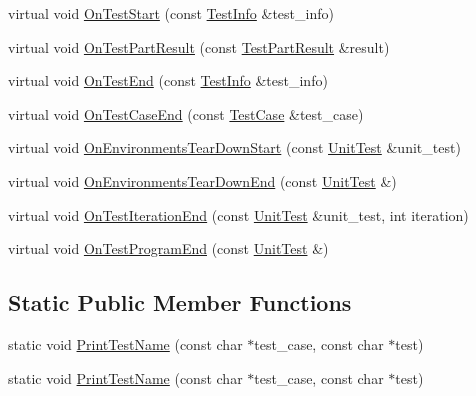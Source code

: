 \begin{DoxyCompactItemize}
\item 
virtual void \hyperlink{classtesting_1_1internal_1_1PrettyUnitTestResultPrinter_ae19a0ede8525bdc3ec6e05725004769b}{\-On\-Test\-Start} (const \hyperlink{classtesting_1_1TestInfo}{\-Test\-Info} \&test\-\_\-info)
\item 
virtual void \hyperlink{classtesting_1_1internal_1_1PrettyUnitTestResultPrinter_a2999e3c9131fe27efd468fb4c20aef3a}{\-On\-Test\-Part\-Result} (const \hyperlink{classtesting_1_1TestPartResult}{\-Test\-Part\-Result} \&result)
\item 
virtual void \hyperlink{classtesting_1_1internal_1_1PrettyUnitTestResultPrinter_a57247960bc1147abddf11908402394c1}{\-On\-Test\-End} (const \hyperlink{classtesting_1_1TestInfo}{\-Test\-Info} \&test\-\_\-info)
\item 
virtual void \hyperlink{classtesting_1_1internal_1_1PrettyUnitTestResultPrinter_a3cc06a6f14e5734766b458543ca2115e}{\-On\-Test\-Case\-End} (const \hyperlink{classtesting_1_1TestCase}{\-Test\-Case} \&test\-\_\-case)
\item 
virtual void \hyperlink{classtesting_1_1internal_1_1PrettyUnitTestResultPrinter_a3dd57271e7f1c9b85e8280acc6114b03}{\-On\-Environments\-Tear\-Down\-Start} (const \hyperlink{classtesting_1_1UnitTest}{\-Unit\-Test} \&unit\-\_\-test)
\item 
virtual void \hyperlink{classtesting_1_1internal_1_1PrettyUnitTestResultPrinter_af00cb6141021245e02c511782ce66b46}{\-On\-Environments\-Tear\-Down\-End} (const \hyperlink{classtesting_1_1UnitTest}{\-Unit\-Test} \&)
\item 
virtual void \hyperlink{classtesting_1_1internal_1_1PrettyUnitTestResultPrinter_a736a6086d1aca9c9d63810d73ea1ef0e}{\-On\-Test\-Iteration\-End} (const \hyperlink{classtesting_1_1UnitTest}{\-Unit\-Test} \&unit\-\_\-test, int iteration)
\item 
virtual void \hyperlink{classtesting_1_1internal_1_1PrettyUnitTestResultPrinter_a79232f629150d6a1e560f6729271e729}{\-On\-Test\-Program\-End} (const \hyperlink{classtesting_1_1UnitTest}{\-Unit\-Test} \&)
\end{DoxyCompactItemize}
\subsection*{\-Static \-Public \-Member \-Functions}
\begin{DoxyCompactItemize}
\item 
static void \hyperlink{classtesting_1_1internal_1_1PrettyUnitTestResultPrinter_a4ec2068e374e2e36d6c61dbae70d98a4}{\-Print\-Test\-Name} (const char $\ast$test\-\_\-case, const char $\ast$test)
\item 
static void \hyperlink{classtesting_1_1internal_1_1PrettyUnitTestResultPrinter_a4ec2068e374e2e36d6c61dbae70d98a4}{\-Print\-Test\-Name} (const char $\ast$test\-\_\-case, const char $\ast$test)
\end{DoxyCompactItemize}
